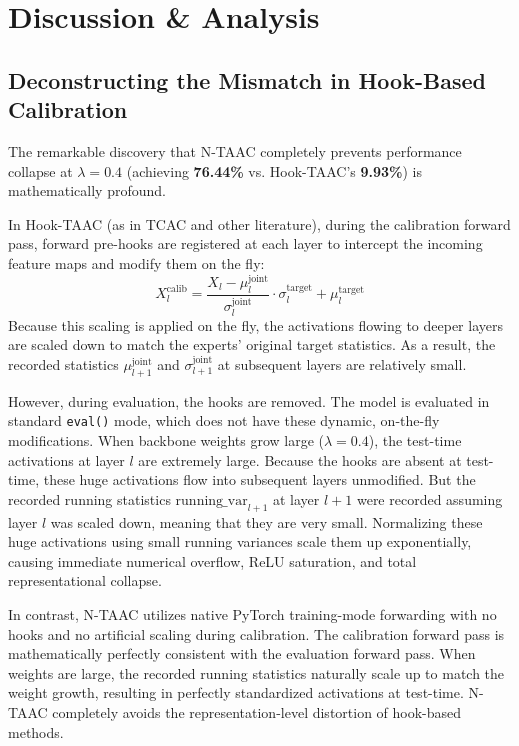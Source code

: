 \documentclass{article}
\theoremstyle{plain}
\theoremstyle{definition}
\theoremstyle{remark}
\begin{document}
\section{Discussion \& Analysis}
\label{submission-discussion}

\subsection{Deconstructing the Mismatch in Hook-Based Calibration}
The remarkable discovery that N-TAAC completely prevents performance collapse at $\lambda=0.4$ (achieving \textbf{76.44\%} vs. Hook-TAAC's \textbf{9.93\%}) is mathematically profound. 

In Hook-TAAC (as in TCAC and other literature), during the calibration forward pass, forward pre-hooks are registered at each layer to intercept the incoming feature maps and modify them on the fly:
\begin{equation}
X_l^{\text{calib}} = \frac{X_l - \mu_{l}^{\text{joint}}}{\sigma_{l}^{\text{joint}}} \cdot \sigma_l^{\text{target}} + \mu_l^{\text{target}}
\end{equation}
Because this scaling is applied on the fly, the activations flowing to deeper layers are scaled down to match the experts' original target statistics. As a result, the recorded statistics $\mu_{l+1}^{\text{joint}}$ and $\sigma_{l+1}^{\text{joint}}$ at subsequent layers are relatively small.

However, during evaluation, the hooks are removed. The model is evaluated in standard \texttt{eval()} mode, which does not have these dynamic, on-the-fly modifications. When backbone weights grow large ($\lambda=0.4$), the test-time activations at layer $l$ are extremely large. Because the hooks are absent at test-time, these huge activations flow into subsequent layers unmodified. But the recorded running statistics $\text{running\_var}_{l+1}$ at layer $l+1$ were recorded assuming layer $l$ was scaled down, meaning that they are very small. Normalizing these huge activations using small running variances scale them up exponentially, causing immediate numerical overflow, ReLU saturation, and total representational collapse.

In contrast, N-TAAC utilizes native PyTorch training-mode forwarding with no hooks and no artificial scaling during calibration. The calibration forward pass is mathematically perfectly consistent with the evaluation forward pass. When weights are large, the recorded running statistics naturally scale up to match the weight growth, resulting in perfectly standardized activations at test-time. N-TAAC completely avoids the representation-level distortion of hook-based methods.
\end{document}
